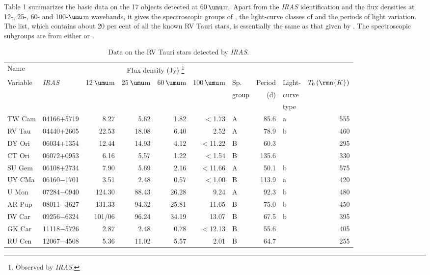 \documentclass[useAMS,usedcolumn,usegraphicx,usenatbib]{mn2e}
\begin{document}
Table 1 summarizes the basic data on the 17 objects  detected at
\hbox{60\,$\umu$m}. Apart from the {\it IRAS\/} identification and
the flux densities at 12-, 25-, 60-  and 100-$\umu$m wavebands, it
gives the spectroscopic groups of \citet{b20}, the light-curve
classes of \citet{b13} and the periods of light variation. The
list, which contains  about 20 per cent of all the known RV Tauri
stars, is  essentially the same as that given by \citet{b12}. The
spectroscopic subgroups are from either \citet{b20} or
\citet{b15}.
\begin{table*}
 \centering
 \begin{minipage}{140mm}
  \caption{Data on the RV Tauri stars detected by {\it IRAS}.}
  \begin{tabular}{@{}llrrrrlrlr@{}}
  \hline
   Name     &            & \multicolumn{4}{c}{Flux density (Jy)%
  \footnote{Observed by {\em IRAS}.}}\\
   Variable & {\it IRAS} & 12$\,\umu$m & 25$\,\umu$m & 60$\,\umu$m
     & 100$\,\umu$m & Sp. & Period & Light- & $T_0\,(\rmn{K})$ \\
        &  &  &  &  &  & group & (d) & curve \\
        &  &  &  &  &  &       &     & type  \\
 \hline
 TW Cam & 04166$+$5719 & 8.27 & 5.62 & 1.82 & $<$1.73 & A & 85.6 & a & 555 \\
 RV Tau & 04440$+$2605 & 22.53 & 18.08 & 6.40 & 2.52 & A & 78.9 & b & 460 \\
 DY Ori & 06034$+$1354 & 12.44 & 14.93 & 4.12 & $<$11.22 & B & 60.3 &  & 295 \\
 CT Ori & 06072$+$0953 & 6.16 & 5.57 & 1.22 & $<$1.54 & B & 135.6 &  & 330 \\
 SU Gem & 06108$+$2734 & 7.90 & 5.69 & 2.16 & $<$11.66 & A & 50.1 & b & 575 \\
 UY CMa & 06160$-$1701 & 3.51 & 2.48 & 0.57 & $<$1.00 & B & 113.9 & a & 420 \\
 U Mon  & 07284$-$0940 & 124.30 & 88.43 & 26.28 & 9.24 & A & 92.3 & b & 480 \\
 AR Pup & 08011$-$3627 & 131.33 & 94.32 & 25.81 & 11.65 & B & 75.0 & b & 450 \\
 IW Car & 09256$-$6324 & 101/06 & 96.24 & 34.19 & 13.07 & B & 67.5 & b & 395 \\
 GK Car & 11118$-$5726 & 2.87 & 2.48 & 0.78 & $<$12.13 & B & 55.6 &  & 405 \\
 RU Cen & 12067$-$4508 & 5.36 & 11.02 & 5.57 & 2.01 & B & 64.7 &  & 255 \\

\end{tabular}
\end{minipage}
\end{table*}
\end{document}
